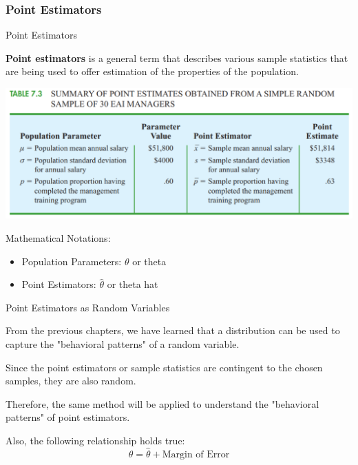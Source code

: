 \documentclass{beamer}
\begin{document}
\subsubsection{Point Estimators}

\begin{frame}{Point Estimators}

\textbf{Point estimators} is a general term that describes various sample statistics that are being used to offer estimation of the properties of the population. 

\begin{center}
\includegraphics[scale=0.3]{images/section5PointEstimators.png}
\end{center}

Mathematical Notations: 
\begin{itemize}
\item Population Parameters: $\theta$ or theta
\item Point Estimators: $\hat{\theta}$ or theta hat
\end{itemize}

\end{frame}


\begin{frame}{Point Estimators as Random Variables}

From the previous chapters, we have learned that a distribution can be used to capture the "behavioral patterns" of a random variable.

\vspace{0.3 cm}

Since the point estimators or sample statistics are contingent to the chosen samples, they are also random. 

\vspace{0.3 cm}
Therefore, the same method will be applied to understand the "behavioral patterns" of point estimators. 

\vspace{0.3 cm}
Also, the following relationship holds true: 
$$ \theta = \hat{\theta} + \text{Margin of Error} $$

\end{frame}
\end{document}
